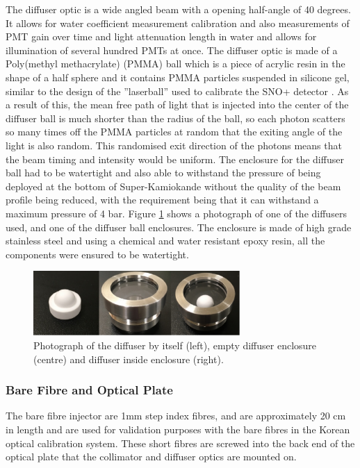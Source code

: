 The diffuser optic is a wide angled beam with a opening half-angle of 40 degrees. It allows for water coefficient measurement calibration and also measurements of PMT gain over time and light attenuation length in water and allows for illumination of several hundred PMTs at once. The diffuser optic is made of a Poly(methyl methacrylate) (PMMA) ball which is a piece of acrylic resin in the shape of a half sphere and it contains PMMA particles suspended in silicone gel, similar to the design of the ''laserball'' used to calibrate the SNO+ detector \cite{Moffat_2005}. As a result of this, the mean free path of light that is injected into the center of the diffuser ball is much shorter than the radius of the ball, so each photon scatters so many times off the PMMA particles at random that the exiting angle of the light is also random. This randomised exit direction of the photons means that the beam timing and intensity would be uniform.  
\newline
The enclosure for the diffuser ball had to be watertight and also able to withstand the pressure of being deployed at the bottom of Super-Kamiokande without the quality of the beam profile being reduced, with the requirement being that it can withstand a maximum pressure of 4 bar. Figure \ref{fig:diffuser_photo} shows a photograph of one of the diffusers used, and one of the diffuser ball enclosures. The enclosure is made of high grade stainless steel and using a chemical and water resistant epoxy resin, all the components were ensured to be watertight. 

\begin{figure}
    \centering
    \includegraphics[width=0.7\textwidth]{Figures/diffuser_photo.png}
    \caption{Photograph of the diffuser by itself (left), empty diffuser enclosure (centre) and diffuser inside enclosure (right).}
    \label{fig:diffuser_photo}
\end{figure}

\subsubsection{Bare Fibre and Optical Plate}

The bare fibre injector are 1mm step index fibres, and are approximately 20 cm in length and are used for validation purposes with the bare fibres in the Korean optical calibration system. These short fibres are screwed into the back end of the optical plate that the collimator and diffuser optics are mounted on.

